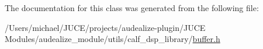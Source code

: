 The documentation for this class was generated from the following file\+:\begin{DoxyCompactItemize}
\item 
/\+Users/michael/\+J\+U\+C\+E/projects/audealize-\/plugin/\+J\+U\+C\+E Modules/audealize\+\_\+module/utils/calf\+\_\+dsp\+\_\+library/\hyperlink{buffer_8h}{buffer.\+h}\end{DoxyCompactItemize}
